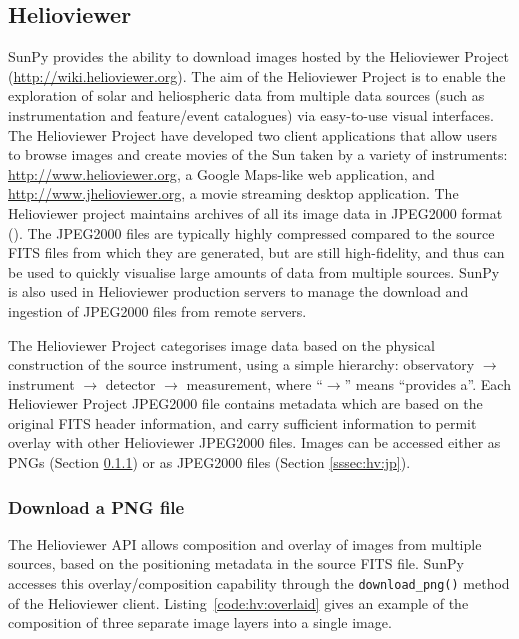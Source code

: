 \subsection{Helioviewer}\label{ssec:hv}

SunPy provides the ability to download images hosted by the
Helioviewer Project (\url{http://wiki.helioviewer.org}).  
The aim of the Helioviewer Project is to enable
the exploration of solar and heliospheric data from multiple data
sources (such as instrumentation and feature/event catalogues) via
easy-to-use visual interfaces. The Helioviewer Project have developed two client 
applications that allow users to browse images and create movies of the Sun taken 
by a variety of instruments: \url{http://www.helioviewer.org}, a 
Google Maps-like web application, and \url{http://www.jhelioviewer.org}, 
a movie streaming desktop application. The Helioviewer
project maintains archives of all its image data in JPEG2000 format (\citealt{muller2009}). The
JPEG2000 files are typically highly compressed compared to the source
FITS files from which they are generated, but are still high-fidelity, and thus can be used to quickly
visualise large amounts of data from multiple sources.  SunPy is
also used in Helioviewer production servers to manage the download and
ingestion of JPEG2000 files from remote servers.

The Helioviewer Project categorises image data based on the physical
construction of the source instrument, using a simple hierarchy:
observatory $\rightarrow$ instrument $\rightarrow$ detector
$\rightarrow$ measurement, where ``$\rightarrow$'' means ``provides a''.  
Each Helioviewer Project JPEG2000 file contains
metadata which are based on the original FITS header
information, and carry sufficient information to permit overlay with
other Helioviewer JPEG2000 files. Images can be accessed either as
PNGs (Section \ref{sssec:hv:png}) or as JPEG2000 files (Section
\ref{sssec:hv:jp}).

\subsubsection{Download a PNG file}\label{sssec:hv:png}

The Helioviewer API allows composition and overlay of images from
multiple sources, based on the positioning metadata in the source FITS
file.  SunPy accesses this overlay/composition capability through the
\texttt{download\_png()} method of the Helioviewer client.  Listing~\ref{code:hv:overlaid}
gives an example of the composition of three
separate image layers into a single image.

